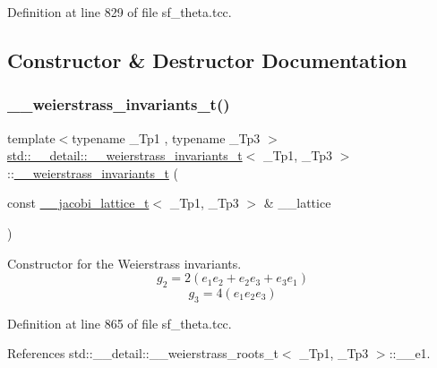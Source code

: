 Definition at line 829 of file sf\+\_\+theta.\+tcc.



\subsection{Constructor \& Destructor Documentation}
\mbox{\label{structstd_1_1____detail_1_1____weierstrass__invariants__t_aeef3f4f3bbb7a950efea23f7c9168091}} 
\subsubsection{\texorpdfstring{\+\_\+\+\_\+weierstrass\+\_\+invariants\+\_\+t()}{\_\_weierstrass\_invariants\_t()}}
{\footnotesize\ttfamily template$<$typename \+\_\+\+Tp1 , typename \+\_\+\+Tp3 $>$ \\
\hyperlink{structstd_1_1____detail_1_1____weierstrass__invariants__t}{std\+::\+\_\+\+\_\+detail\+::\+\_\+\+\_\+weierstrass\+\_\+invariants\+\_\+t}$<$ \+\_\+\+Tp1, \+\_\+\+Tp3 $>$\+::\hyperlink{structstd_1_1____detail_1_1____weierstrass__invariants__t}{\+\_\+\+\_\+weierstrass\+\_\+invariants\+\_\+t} (\begin{DoxyParamCaption}\item[{const \hyperlink{structstd_1_1____detail_1_1____jacobi__lattice__t}{\+\_\+\+\_\+jacobi\+\_\+lattice\+\_\+t}$<$ \+\_\+\+Tp1, \+\_\+\+Tp3 $>$ \&}]{\+\_\+\+\_\+lattice }\end{DoxyParamCaption})}

Constructor for the Weierstrass invariants. \[ g_2 = 2(e_1 e_2 + e_2 e_3 + e_3 e_1) \] \[ g_3 = 4(e_1 e_2 e_3) \] 

Definition at line 865 of file sf\+\_\+theta.\+tcc.



References std\+::\+\_\+\+\_\+detail\+::\+\_\+\+\_\+weierstrass\+\_\+roots\+\_\+t$<$ \+\_\+\+Tp1, \+\_\+\+Tp3 $>$\+::\+\_\+\+\_\+e1.



